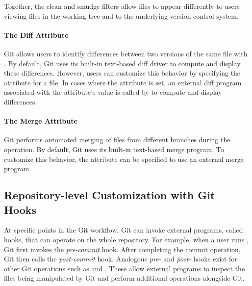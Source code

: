 Together, the clean and smudge filters allow files to appear differently to users viewing files in the working tree and to the underlying version control system.


\paragraph{The Diff Attribute}
Git allows users to identify differences between two versions of the same file with . By default, Git uses its built-in text-based diff driver to compute and display these differences. However, users can customize this behavior by specifying the  attribute for a file. In cases where the  attribute is set, an external diff program associated with the attribute's value is called by  to compute and display differences.

\paragraph{The Merge Attribute}
Git performs automated merging of files from different branches during the  operation. By default, Git uses its built-in text-based merge program. To customize this behavior, the  attribute can be specified to use an external merge program.

\subsection{Repository-level Customization with Git Hooks}
At specific points in the Git workflow, Git can invoke external programs, called hooks, that can operate on the whole repository. For example, when a user runs , Git first invokes the \emph{pre-commit} hook. After completing the commit operation, Git then calls the \emph{post-commit} hook. Analogous \emph{pre-} and \emph{post-} hooks exist for other Git operations such as  and . These allow external programs to inspect the files being manipulated by Git and perform additional operations alongside Git.

